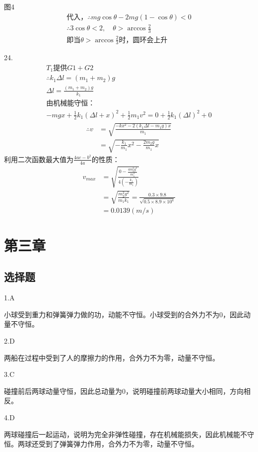 \documentclass[b5paper,opensource]{./template/qyxf-book}
\begin{document}
图4
\begin{gather*}
\text{代入，}\therefore mg\cos\theta-2mg(1-\cos\theta)<0\\
\therefore 3\cos\theta<2,\quad \theta>\arccos\frac{2}{3}\\
\text{即当}\theta>\arccos\frac{2}{3}\text{时，圆环会上升}
\end{gather*}
\raggedright
24.
\begin{gather*}
T_1\text{提供}G1+G2\\
\therefore k_1\Delta l=(m_1+m_2)g\\
\Delta l=\frac{(m_1+m_2)g}{k_1}\\
\text{由机械能守恒：}\\
-mgx+\frac{1}{2}k_1(\Delta l+x)^2+\frac{1}{2}m_1v^2=0+\frac{1}{2}k_1(\Delta l)^2+0
\end{gather*}
\begin{align*}
\therefore v&=\sqrt{\frac{-kx^2-2(k_1\Delta l-m_1g)x}{m_1}}\\
&=\sqrt{-\frac{k_1}{m_1}x^2-\frac{2m_2g}{m_1}x}
\end{align*}
利用二次函数最大值为$\frac{4ac-b^2}{4a}$的性质：
\begin{align*}
v_{max}	&=\sqrt{\frac{0-\frac{4m_2^2g^2}{m_1^2}}{4\left(-\frac{k_1}{m_1}\right)}}\\
&=\sqrt{\frac{m_2^2g^2}{m_1k_1}}=\frac{0.3\times 9.8}{\sqrt{0.5\times 8.9\times 10^4}}\\
&=0.0139(m/s)
\end{align*}

\chapter{第三章}
	\section{选择题}
		1.A
		
		小球受到重力和弹簧弹力做的功，动能不守恒。小球受到的合外力不为0，因此动量不守恒。
		
		2.D
		
		两船在过程中受到了人的摩擦力的作用，合外力不为零，动量不守恒。
		
		3.C
		
		碰撞前后两球动量守恒，因此总动量为0，说明碰撞前两球动量大小相同，方向相反。
		
		4.D
		
		两球碰撞后一起运动，说明为完全非弹性碰撞，存在机械能损失，因此机械能不守恒。两球还受到了弹簧弹力作用，合外力不为零，动量不守恒。
		
\end{document}
